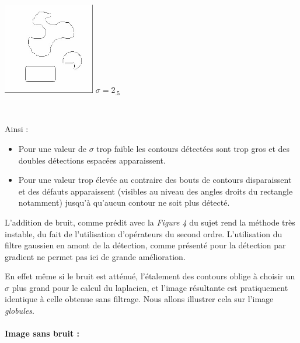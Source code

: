\documentclass[a4,12pt]{article}
\begin{document}
\begin{center}
	\begin{minipage}[c]{0.24\linewidth}
		\begin{center}
			\includegraphics[width = 40mm]{./img/ctrformes1-2_5.jpg}
			\textit{$\sigma = 2_.5$}
		\end{center}
	\end{minipage}\\
\end{center}

Ainsi :
\begin{itemize}
	\item Pour une valeur de $\sigma$ trop faible les contours détectées sont trop gros et des doubles détections espacées apparaissent.
	\item Pour une valeur trop élevée au contraire des bouts de contours disparaissent et des défauts apparaissent (visibles au niveau des angles droits du rectangle notamment) jusqu'à qu'aucun contour ne soit plus détecté.\\
\end{itemize}


L'addition de bruit, comme prédit avec la \textit{Figure 4} du sujet rend la méthode très instable, du fait de l'utilisation d'opérateurs du second ordre. L'utilisation du filtre gaussien en amont de la détection, comme présenté pour la détection par gradient ne permet pas ici de grande amélioration.

En effet même si le bruit est atténué, l'étalement des contours oblige à choisir un $\sigma$ plus grand pour le calcul du laplacien, et l'image résultante est pratiquement identique à celle obtenue sans filtrage. Nous allons illustrer cela sur l'image \textit{globules}.\\\\

\textbf{Image sans bruit :}
\end{document}
